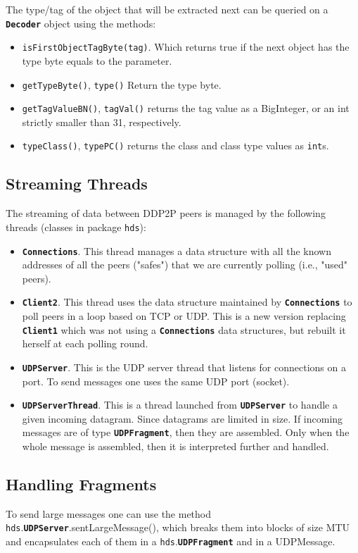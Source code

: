 \documentclass{book}
\newcommand{\pkg}[1]{{\tt #1}}
\newcommand{\cls}[1]{{\tt\bf #1}}
\newcommand{\mth}[1]{{\tt #1}}
\begin{document}
The type/tag of the object that will be extracted next can be queried on a \cls{Decoder} object using the methods:
\begin{itemize}
\item
\mth{isFirstObjectTagByte(tag)}.
Which returns true if the next object has the type byte equals to the parameter.
\item
\mth{getTypeByte()}, \mth{type()}
Return the type byte.
\item
\mth{getTagValueBN()}, \mth{tagVal()}
returns the tag value as a BigInteger, or an int strictly smaller than 31, respectively.
\item
\mth{typeClass()}, \mth{typePC()}
returns the class and class type values as {\tt int}s.
\end{itemize}

\subsection{Streaming Threads}
The streaming of data between DDP2P peers is managed by the following threads (classes in package \pkg{hds}):
\begin{itemize}
\item
\cls{Connections}. This thread manages a data structure with all the known addresses of all the peers ("safes") that we are currently polling (i.e., "used" peers).
\item
\cls{Client2}. This thread uses the data structure maintained by \cls{Connections} to poll peers in a loop based on TCP or UDP. This is a new
version replacing \cls{Client1} which was not using a \cls{Connections} data structures, but rebuilt it herself at each polling round.
\item
\cls{UDPServer}. This is the UDP server thread that listens for connections on a port. To send messages one uses the same 
UDP port (socket). 

\item
\cls{UDPServerThread}. This is a thread launched from \cls{UDPServer} to handle a given incoming datagram. Since
datagrams are limited in size. If incoming messages are of type \cls{UDPFragment}, then they are assembled. Only when
the whole message is assembled, then it is interpreted further and handled.
\end{itemize}

\subsection{Handling Fragments}
To send large messages one can use the method \pkg{hds}.\cls{UDPServer}.sentLargeMessage(),
which breaks them into blocks of size MTU and encapsulates each of them in a \pkg{hds}.\cls{UDPFragment} and in a UDPMessage.
\end{document}
